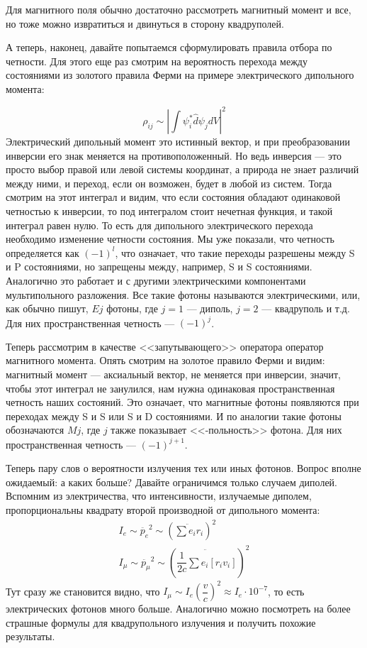 \documentclass[12pt]{article}
\begin{document}
\vspace{1em} \noindent
Для магнитного поля обычно достаточно рассмотреть магнитный момент и все, но тоже можно извратиться и двинуться в сторону квадруполей.

\vspace{1em} \noindent
А теперь, наконец, давайте попытаемся сформулировать правила отбора по четности. Для этого еще раз смотрим на вероятность перехода между состояниями из золотого правила Ферми на примере электрического дипольного момента:

\begin{equation*}
    \rho_{ij} \sim \left| \int \psi^*_i\hat{d}\psi_j dV\right|^2
\end{equation*}
Электрический дипольный момент это истинный вектор, и при преобразовании инверсии его знак меняется на противоположенный. Но ведь инверсия --- это просто выбор правой или левой системы координат, а природа не знает различий между ними, и переход, если он возможен, будет в любой из систем. Тогда смотрим на этот интеграл и видим, что если состояния обладают одинаковой четностью к инверсии, то под интегралом стоит нечетная функция, и такой интеграл равен нулю. То есть для дипольного электрического перехода необходимо изменение четности состояния. Мы уже показали, что четность определяется как $(-1)^l$, что означает, что такие переходы разрешены между S и P состояниями, но запрещены между, например, S и S состояниями. Аналогично это работает и с другими электрическими компонентами мультипольного разложения. Все такие фотоны называются электрическими, или, как обычно пишут, $Ej$ фотоны, где $j=1$ --- диполь, $j=2$ --- квадруполь и т.д. Для них пространственная четность --- $(-1)^j$.

\vspace{1em} \noindent
Теперь рассмотрим в качестве <<запутывающего>> оператора оператор магнитного момента. Опять смотрим на золотое правило Ферми и видим: магнитный момент --- аксиальный вектор, не меняется при инверсии, значит, чтобы этот интеграл не занулился, нам нужна одинаковая пространственная четность наших состояний. Это означает, что магнитные фотоны появляются при переходах между S и S или S и D состояниями. И по аналогии такие фотоны обозначаются $Mj$, где $j$ также показывает <<-польность>> фотона. Для них пространственная четность --- $(-1)^{j+1}$.

\vspace{1em} \noindent
Теперь пару слов о вероятности излучения тех или иных фотонов. Вопрос вполне ожидаемый: а каких больше? Давайте ограничимся только случаем диполей. Вспомним из электричества, что интенсивности, излучаемые диполем, пропорциональны квадрату второй производной от дипольного момента:
\begin{gather*}
    I_e \sim \ddot{p_e}^2 \sim \left(\ddot{\sum{e_i r_i}} \right)^2\\
    I_{\mu} \sim \ddot{p_{\mu}}^2\sim \left(\ddot{\dfrac{1}{2c}\sum{e_i [r_i v_i]}} \right)^2
\end{gather*}
Тут сразу же становится видно, что $ I_{\mu} \sim  I_{e} \left(\dfrac{v}{c} \right)^2\approx I_e \cdot 10^{-7}$, то есть электрических фотонов много больше. Аналогично можно посмотреть на более страшные формулы для квадрупольного излучения и получить похожие результаты.
\end{document}
